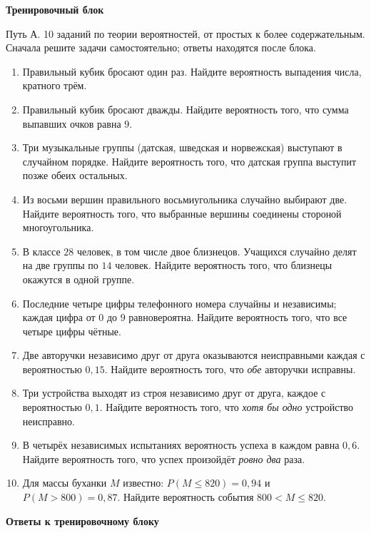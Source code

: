 \documentclass[a4paper,12pt]{article}
\begin{document}
\clearpage
\begin{center}{\Large\color{darkaccent}\textbf{Тренировочный блок}}\par\end{center}
\vspace{3mm}
\textcolor{muted}{Путь А. 10 заданий по теории вероятностей, от простых к более содержательным. Сначала решите задачи самостоятельно; ответы находятся после блока.}
\begin{enumerate}[label=\textbf{\arabic*.},itemsep=11pt]
\item Правильный кубик бросают один раз. Найдите вероятность выпадения числа, кратного трём.
\item Правильный кубик бросают дважды. Найдите вероятность того, что сумма выпавших очков равна $9$.
\item Три музыкальные группы (датская, шведская и норвежская) выступают в случайном порядке. Найдите вероятность того, что датская группа выступит позже обеих остальных.
\item Из восьми вершин правильного восьмиугольника случайно выбирают две. Найдите вероятность того, что выбранные вершины соединены стороной многоугольника.
\item В классе $28$ человек, в том числе двое близнецов. Учащихся случайно делят на две группы по $14$ человек. Найдите вероятность того, что близнецы окажутся в одной группе.
\item Последние четыре цифры телефонного номера случайны и независимы; каждая цифра от $0$ до $9$ равновероятна. Найдите вероятность того, что все четыре цифры чётные.
\item Две авторучки независимо друг от друга оказываются неисправными каждая с вероятностью $0{,}15$. Найдите вероятность того, что \emph{обе} авторучки исправны.
\item Три устройства выходят из строя независимо друг от друга, каждое с вероятностью $0{,}1$. Найдите вероятность того, что \emph{хотя бы одно} устройство неисправно.
\item В четырёх независимых испытаниях вероятность успеха в каждом равна $0{,}6$. Найдите вероятность того, что успех произойдёт \emph{ровно два} раза.
\item Для массы буханки $M$ известно: $P(M\le820)=0{,}94$ и $P(M>800)=0{,}87$. Найдите вероятность события $800<M\le820$.
\end{enumerate}
\clearpage
\begin{center}{\Large\color{darkaccent}\textbf{Ответы к тренировочному блоку}}\par\end{center}
\end{document}
